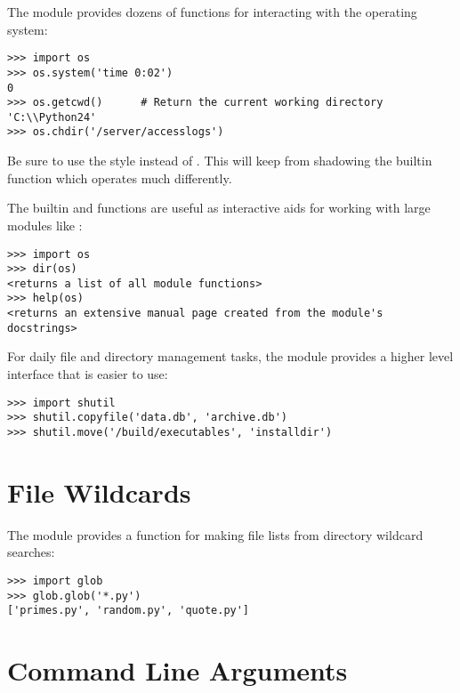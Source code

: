 \documentclass{manual}
\begin{document}
The 
module provides dozens of functions for interacting with the
operating system:

\begin{verbatim}
>>> import os
>>> os.system('time 0:02')
0
>>> os.getcwd()      # Return the current working directory
'C:\\Python24'
>>> os.chdir('/server/accesslogs')
\end{verbatim}

Be sure to use the  style instead of
.  This will keep  from
shadowing the builtin  function which operates much
differently.

The builtin  and  functions are useful
as interactive aids for working with large modules like :

\begin{verbatim}
>>> import os
>>> dir(os)
<returns a list of all module functions>
>>> help(os)
<returns an extensive manual page created from the module's docstrings>
\end{verbatim}

For daily file and directory management tasks, the 
module provides a higher level interface that is easier to use:

\begin{verbatim}
>>> import shutil
>>> shutil.copyfile('data.db', 'archive.db')
>>> shutil.move('/build/executables', 'installdir')
\end{verbatim}


\section{File Wildcards\label{file-wildcards}}

The 
module provides a function for making file lists from directory
wildcard searches:

\begin{verbatim}
>>> import glob
>>> glob.glob('*.py')
['primes.py', 'random.py', 'quote.py']
\end{verbatim}


\section{Command Line Arguments\label{command-line-arguments}}
\end{document}
